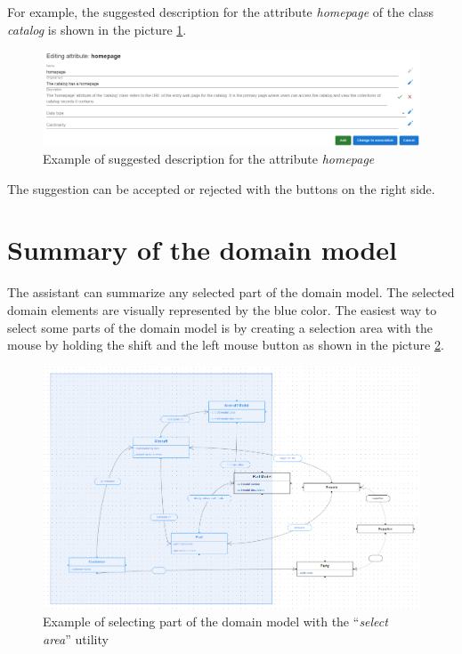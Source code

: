 For example, the suggested description for the attribute \textit{homepage} of the class \textit{catalog} is shown in the picture \ref{fig:suggested_single_field}.

\begin{figure}[!h]
    \includegraphics[scale=0.35]{../docs/images/frontend/suggested-single-field.png}
    \caption{\centering Example of suggested description for the attribute \textit{homepage}}
    \label{fig:suggested_single_field}
\end{figure}

The suggestion can be accepted or rejected with the buttons on the right side.


\section{Summary of the domain model}

The assistant can summarize any selected part of the domain model. The selected domain elements are visually represented by the blue color. The easiest way to select some parts of the domain model is by creating a selection area with the mouse by holding the shift and the left mouse button as shown in the picture \ref{fig:selection}.

\begin{figure}[!h]
    \includegraphics[scale=0.4]{../docs/images/frontend/selection.png}
    \caption{\centering Example of selecting part of the domain model with the ``\textit{select area}'' utility}
    \label{fig:selection}
\end{figure}

